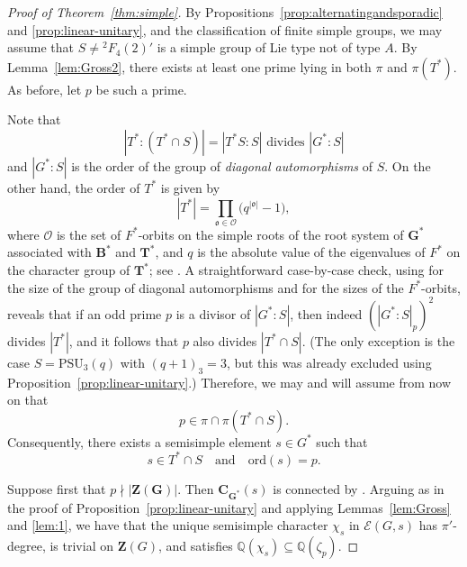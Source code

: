 \documentclass[12pt]{amsart}
\theoremstyle{definition}
\numberwithin{equation}{section}
\newcommand{\PSU}{{\mathrm {PSU}}}
\newcommand{\ord}{{\mathrm {ord}}}
\newcommand{\QQ}{{\mathbb Q}}
\newcommand{\EC}{\mathcal{E}}
\newcommand{\bC}{{\mathbf{C}}}
\newcommand{\bG}{{\mathbf{G}}}
\newcommand{\bT}{{\mathbf{T}}}
\newcommand{\bB}{{\mathbf{B}}}
\newcommand{\bZ}{{\mathbf{Z}}}
\begin{document}
\begin{proof}[Proof of Theorem~\ref{thm:simple}]
By Propositions~\ref{prop:alternatingandsporadic} and
\ref{prop:linear-unitary}, and the classification of finite simple
groups, we may assume %
that $S \neq {}^2F_4(2)'$ is %
a simple group of
Lie type not of type $A$. By Lemma~\ref{lem:Gross2}, there exists at
least one prime lying in both $\pi$ and $\pi(T^*)$. As before, let
$p$ be such a prime.

Note that
\[
|T^*:(T^*\cap S)| = |T^*S:S| \text{ divides } |G^*:S|
\]
and $|G^*:S|$ is the order of the group of \emph{diagonal
automorphisms} of $S$. On the other hand, the order of $T^*$ is
given %
by
\[
|T^*|=\prod_{\mathfrak{o}\in \mathcal{O}}
\bigl(q^{|\mathfrak{o}|}-1\bigr),
\]
where %
$\mathcal{O}$ is the set of $F^*$-orbits on the simple roots
of the root system of $\bG^*$ associated with $\bB^*$ and $\bT^*$,
and $q$ is the absolute value of the eigenvalues of $F^*$ on the
character group of $\bT^*$; see \cite[p.~74]{Carter85}. A
straightforward case-by-case check, using \cite[Table~5]{Atl1} for
the size of the group of diagonal automorphisms and
\cite[\S1.19]{Carter85} for the sizes of the $F^*$-orbits, reveals
that if an odd prime $p$ is a divisor of $|G^*:S|$, then indeed
$(|G^*:S|_p)^2$ divides $|T^*|$, and it follows that $p$ also
divides $|T^*\cap S|$. (The only exception is the case $S=\PSU_3(q)$
with $(q+1)_3=3$, but this was already excluded using
Proposition~\ref{prop:linear-unitary}.) Therefore, we may and will
assume from now on that \[p\in \pi\cap \pi(T^*\cap S).\]
Consequently, there exists a semisimple %
element $s\in G^*$ such %
that
\[
s\in T^*\cap S \quad\text{and}\quad \ord(s)=p.
\]

Suppose %
first that $p\nmid |\bZ(\bG)|$. Then $\bC_{\bG^*}(s)$ is
connected by \cite[Corollary~4.6]{Borel70}. Arguing as in the proof
of Proposition~\ref{prop:linear-unitary} and applying
Lemmas~\ref{lem:Gross} and \ref{lem:1}, we have that the unique
semisimple character $\chi_s$ in $\EC(G,s)$ has $\pi'$-degree, is
trivial on $\bZ(G)$, and satisfies $\QQ(\chi_s)\subseteq
\QQ(\zeta_p)$.


\end{proof}
\end{document}
